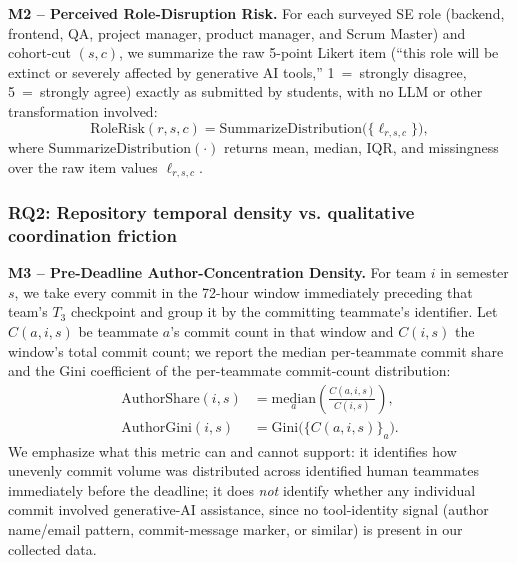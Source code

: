 \documentclass[conference]{IEEEtran}
\begin{document}
\textbf{M2 -- Perceived Role-Disruption Risk.} For each surveyed SE role
(backend, frontend, QA, project manager, product manager, and Scrum Master)
and cohort-cut $(s,c)$, we summarize the raw 5-point Likert item (``this role
will be extinct or severely affected by generative AI tools,'' 1~=~strongly
disagree, 5~=~strongly agree) exactly as submitted by students, with no LLM
or other transformation involved:
\[
\mathrm{RoleRisk}(r,s,c) = \mathrm{SummarizeDistribution}\big(\{\ell_{r,s,c}\}\big),
\]
where $\mathrm{SummarizeDistribution}(\cdot)$ returns mean, median, IQR, and
missingness over the raw item values $\ell_{r,s,c}$.

\subsubsection{RQ2: Repository temporal density vs. qualitative coordination friction}

\textbf{M3 -- Pre-Deadline Author-Concentration Density.} For team $i$ in
semester $s$, we take every commit in the 72-hour window immediately
preceding that team's $T_3$ checkpoint and group it by the committing
teammate's identifier. Let $C(a,i,s)$ be teammate $a$'s commit count in that
window and $C(i,s)$ the window's total commit count; we report the median
per-teammate commit share and the Gini coefficient of the per-teammate
commit-count distribution:
\[
\begin{aligned}
\mathrm{AuthorShare}(i,s)
  &= \underset{a}{\mathrm{median}}
     \left(\frac{C(a,i,s)}{C(i,s)}\right), \\
\mathrm{AuthorGini}(i,s)
  &= \mathrm{Gini}\bigl(\{C(a,i,s)\}_a\bigr).
\end{aligned}
\]
We emphasize what this metric can and cannot support: it identifies how
unevenly commit volume was distributed across identified human teammates
immediately before the deadline; it does \emph{not} identify whether any
individual commit involved generative-AI assistance, since no tool-identity
signal (author name/email pattern, commit-message marker, or similar) is
present in our collected data.
\end{document}
